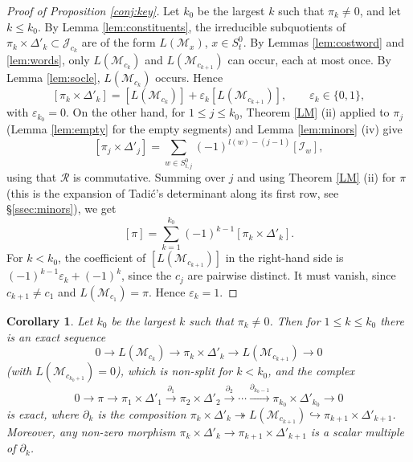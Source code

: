 \documentclass[a4paper,12pt,leqno]{amsart}
\newcommand{\caI}{\mathcal{I}}
\newcommand{\caJ}{\mathcal{J}}
\newcommand{\caM}{\mathcal{M}}
\newcommand{\caR}{\mathcal{R}}
\theoremstyle{plain}
\newtheorem{cor}[thm]{Corollary}
\theoremstyle{definition}
\theoremstyle{definition}
\begin{document}
\begin{proof}[Proof of Proposition \ref{conj:key}]
Let $k_0$ be the largest $k$ such that $\pi_k\neq 0$, and let $k\leq k_0$. By Lemma
\ref{lem:constituents}, the irreducible subquotients of $\pi_k\times\Delta'_k\subset\caJ_{c_k}$ are
of the form $L(\caM_x)$, $x\in S_t^0$. By Lemmas \ref{lem:costword} and \ref{lem:words}, only
$L(\caM_{c_k})$ and $L(\caM_{c_{k+1}})$ can occur, each at most once. By Lemma \ref{lem:socle},
$L(\caM_{c_k})$ occurs. Hence
\[[\pi_k\times\Delta'_k]=[L(\caM_{c_k})]+\varepsilon_k[L(\caM_{c_{k+1}})],\qquad\varepsilon_k\in\{0,1\},\]
with $\varepsilon_{k_0}=0$. On the other hand, for $1\leq j\leq k_0$, Theorem \ref{LM} (ii) applied
to $\pi_j$ (Lemma \ref{lem:empty} for the empty segments) and Lemma \ref{lem:minors} (iv) give
\begin{equation}\label{eq:minorexp}[\pi_j\times\Delta'_j]=\sum_{w\in S^0_{t,j}}(-1)^{l(w)-(j-1)}[\caI_w],\end{equation}
using that $\caR$ is commutative. Summing over $j$ and using Theorem \ref{LM} (ii) for $\pi$
(this is the expansion of Tadi\'c's determinant along its first row, see \S\ref{ssec:minors}), we get
\[[\pi]=\sum_{k=1}^{k_0}(-1)^{k-1}[\pi_k\times\Delta'_k].\]
For $k<k_0$, the coefficient of $[L(\caM_{c_{k+1}})]$ in the right-hand side is
$(-1)^{k-1}\varepsilon_k+(-1)^k$, since the $c_j$ are pairwise distinct. It must vanish, since
$c_{k+1}\neq c_1$ and $L(\caM_{c_1})=\pi$. Hence $\varepsilon_k=1$.
\end{proof}

\begin{cor}\label{cor:zigzag} Let $k_0$ be the largest $k$ such that $\pi_k\neq 0$. Then for $1\leq k\leq k_0$
 there is an exact sequence
\[0\rightarrow L(\caM_{c_k})\rightarrow\pi_k\times\Delta'_k\rightarrow L(\caM_{c_{k+1}})\rightarrow 0\]
(with $L(\caM_{c_{k_0+1}})=0$), which is non-split for $k<k_0$, and the complex
\begin{equation}\label{eq:laplace}
0\rightarrow\pi\rightarrow\pi_1\times\Delta'_1\stackrel{\partial_1}{\rightarrow}
\pi_2\times\Delta'_2\stackrel{\partial_2}{\rightarrow}\cdots\stackrel{\partial_{k_0-1}}
{\rightarrow}\pi_{k_0}\times\Delta'_{k_0}\rightarrow 0\end{equation}
is exact, where $\partial_k$ is the composition $\pi_k\times\Delta'_k\twoheadrightarrow L(\caM_{c_{k+1}})
\hookrightarrow\pi_{k+1}\times\Delta'_{k+1}$. Moreover, any non-zero morphism $\pi_k\times\Delta'_k
\rightarrow\pi_{k+1}\times\Delta'_{k+1}$ is a scalar multiple of $\partial_k$.
\end{cor}
\end{document}
